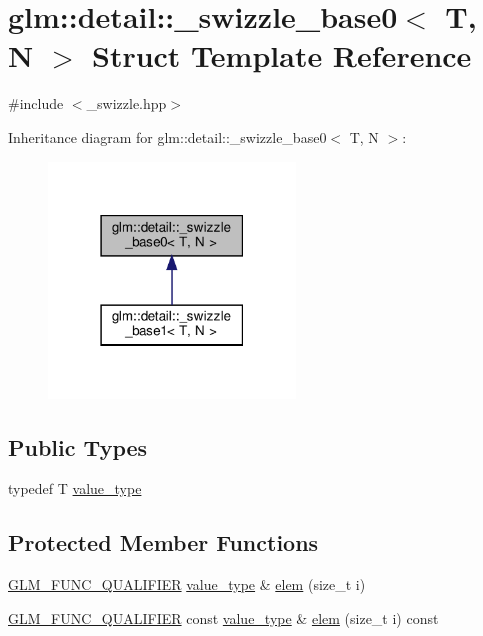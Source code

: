 \hypertarget{structglm_1_1detail_1_1__swizzle__base0}{}\section{glm\+:\+:detail\+:\+:\+\_\+swizzle\+\_\+base0$<$ T, N $>$ Struct Template Reference}
\label{structglm_1_1detail_1_1__swizzle__base0}


{\ttfamily \#include $<$\+\_\+swizzle.\+hpp$>$}



Inheritance diagram for glm\+:\+:detail\+:\+:\+\_\+swizzle\+\_\+base0$<$ T, N $>$\+:\nopagebreak
\begin{figure}[H]
\begin{center}
\leavevmode
\includegraphics[width=186pt]{structglm_1_1detail_1_1__swizzle__base0__inherit__graph}
\end{center}
\end{figure}
\subsection*{Public Types}
\begin{DoxyCompactItemize}
\item 
typedef T \hyperlink{structglm_1_1detail_1_1__swizzle__base0_ad38a739e1fe6d2db2674f34c98159c8f}{value\+\_\+type}
\end{DoxyCompactItemize}
\subsection*{Protected Member Functions}
\begin{DoxyCompactItemize}
\item 
\hyperlink{setup_8hpp_a33fdea6f91c5f834105f7415e2a64407}{G\+L\+M\+\_\+\+F\+U\+N\+C\+\_\+\+Q\+U\+A\+L\+I\+F\+I\+ER} \hyperlink{structglm_1_1detail_1_1__swizzle__base0_ad38a739e1fe6d2db2674f34c98159c8f}{value\+\_\+type} \& \hyperlink{structglm_1_1detail_1_1__swizzle__base0_aebd942a3c3289f9876a9ede4d710d8f0}{elem} (size\+\_\+t i)
\item 
\hyperlink{setup_8hpp_a33fdea6f91c5f834105f7415e2a64407}{G\+L\+M\+\_\+\+F\+U\+N\+C\+\_\+\+Q\+U\+A\+L\+I\+F\+I\+ER} const \hyperlink{structglm_1_1detail_1_1__swizzle__base0_ad38a739e1fe6d2db2674f34c98159c8f}{value\+\_\+type} \& \hyperlink{structglm_1_1detail_1_1__swizzle__base0_abf46336858a3726456386a2c1cd9a62a}{elem} (size\+\_\+t i) const
\end{DoxyCompactItemize}
